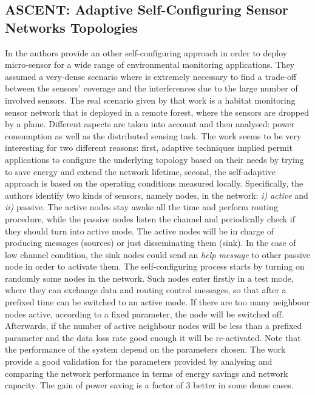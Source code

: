 \subsection*{ASCENT: Adaptive Self-Configuring Sensor Networks Topologies}
In \cite{??} the authors provide an other self-configuring approach in order to deploy micro-sensor for a wide range of environmental monitoring applications. They assumed a very-dense scenario where is extremely necessary to find a trade-off between the sensors' coverage and the interferences due to the large number of involved sensors. The real scenario given by that work is a habitat monitoring sensor network that is deployed in a remote forest, where the sensors are dropped by a plane.
Different aspects are taken into account and then analysed: power consumption as well as the distributed sensing task. The work seems to be very interesting for two different reasons: first, adaptive techniques implied permit applications to configure the underlying topology based on their needs by trying to save energy and extend the network lifetime, second, the self-adaptive approach is based on the operating conditions measured locally.
Specifically, the authors identify two kinds of sensors, namely nodes, in the network: \textit{i) active} and \textit{ii)} passive. The active nodes stay awake all the time and perform routing procedure, while the passive nodes listen the channel and periodically check if they should turn into active mode. The active nodes will be in charge of producing messages (sources) or just disseminating them (sink). In the case of low channel condition, the sink nodes could send an \textit{help message} to other passive node in order to activate them.
The self-configuring process starts by turning on randomly some nodes in the network. Such nodes enter firstly in a test mode, where they can exchange data and routing control messages, so that after a prefixed time can be switched to an active mode. If there are too many neighbour nodes active, according to a fixed parameter, the node will be switched off. Afterwards, if the number of active neighbour nodes will be less than a prefixed parameter and the data loss rate good enough it will be re-activated. 
Note that the performance of the system depend on the parameters chosen. The work provide a good validation for the parameters provided by analysing and comparing the network performance in terms of energy savings and network capacity. The gain of power saving is a factor of $3$ better in some dense cases.